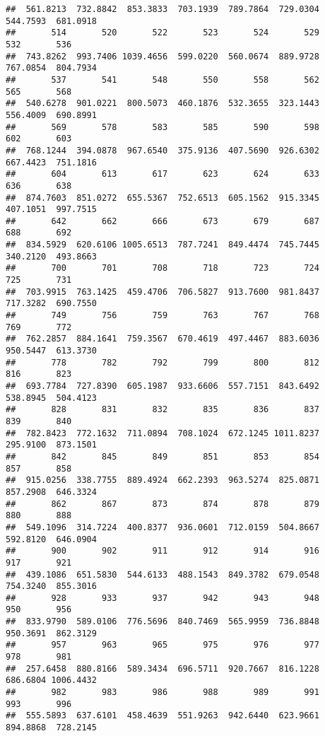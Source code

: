 \documentclass[
]{article}
\begin{document}
\begin{verbatim}
##  561.8213  732.8842  853.3833  703.1939  789.7864  729.0304  544.7593  681.0918 
##       514       520       522       523       524       529       532       536 
##  743.8262  993.7406 1039.4656  599.0220  560.0674  889.9728  767.0854  804.7934 
##       537       541       548       550       558       562       565       568 
##  540.6278  901.0221  800.5073  460.1876  532.3655  323.1443  556.4009  690.8991 
##       569       578       583       585       590       598       602       603 
##  768.1244  394.0878  967.6540  375.9136  407.5690  926.6302  667.4423  751.1816 
##       604       613       617       623       624       633       636       638 
##  874.7603  851.0272  655.5367  752.6513  605.1562  915.3345  407.1051  997.7515 
##       642       662       666       673       679       687       688       692 
##  834.5929  620.6106 1005.6513  787.7241  849.4474  745.7445  340.2120  493.8663 
##       700       701       708       718       723       724       725       731 
##  703.9915  763.1425  459.4706  706.5827  913.7600  981.8437  717.3282  690.7550 
##       749       756       759       763       767       768       769       772 
##  762.2857  884.1641  759.3567  670.4619  497.4467  883.6036  950.5447  613.3730 
##       778       782       792       799       800       812       816       823 
##  693.7784  727.8390  605.1987  933.6606  557.7151  843.6492  538.8945  504.4123 
##       828       831       832       835       836       837       839       840 
##  782.8423  772.1632  711.0894  708.1024  672.1245 1011.8237  295.9100  873.1501 
##       842       845       849       851       853       854       857       858 
##  915.0256  338.7755  889.4924  662.2393  963.5274  825.0871  857.2908  646.3324 
##       862       867       873       874       878       879       880       888 
##  549.1096  314.7224  400.8377  936.0601  712.0159  504.8667  592.8120  646.0904 
##       900       902       911       912       914       916       917       921 
##  439.1086  651.5830  544.6133  488.1543  849.3782  679.0548  754.3240  855.3016 
##       928       933       937       942       943       948       950       956 
##  833.9790  589.0106  776.5696  840.7469  565.9959  736.8848  950.3691  862.3129 
##       957       963       965       975       976       977       978       981 
##  257.6458  880.8166  589.3434  696.5711  920.7667  816.1228  686.6804 1006.4432 
##       982       983       986       988       989       991       993       996 
##  555.5893  637.6101  458.4639  551.9263  942.6440  623.9661  894.8868  728.2145 

\end{verbatim}
\end{document}
